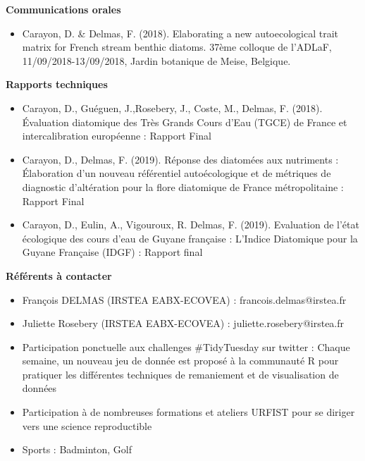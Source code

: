 \documentclass[localFont,alternative]{yaac-another-awesome-cv}
\begin{document}
\textbf{Communications orales}
\begin{itemize}
\item Carayon, D. \& Delmas, F. (2018). Elaborating a new autoecological trait matrix for French stream benthic diatoms. 37ème colloque de l’ADLaF, 11/09/2018-13/09/2018, Jardin botanique de Meise, Belgique.
\end{itemize}

\textbf{Rapports techniques}
\begin{itemize}
\item Carayon, D., Guéguen, J.,Rosebery, J., Coste, M., Delmas, F. (2018). Évaluation diatomique des Très Grands Cours d’Eau (TGCE) de France et intercalibration européenne : Rapport Final

\item Carayon, D., Delmas, F. (2019). Réponse des diatomées aux nutriments : Élaboration d'un nouveau référentiel autoécologique et de métriques de diagnostic d'altération pour la flore diatomique de France métropolitaine : Rapport Final

\item Carayon, D., Eulin, A., Vigouroux, R. Delmas, F. (2019). Evaluation de l’état écologique des cours d’eau de Guyane française : L’Indice Diatomique pour la Guyane Française (IDGF) : Rapport final
\end{itemize}


\textbf{Référents à contacter}
\begin{itemize}
\item François DELMAS (IRSTEA EABX-ECOVEA) : francois.delmas@irstea.fr
\item Juliette Rosebery (IRSTEA EABX-ECOVEA) : juliette.rosebery@irstea.fr
\end{itemize}

	


\begin{itemize}
\item Participation ponctuelle aux challenges \#TidyTuesday sur twitter : Chaque semaine, un nouveau jeu de donnée est proposé à la communauté R pour pratiquer les différentes techniques de remaniement et de visualisation de données
\item Participation à de nombreuses formations et ateliers URFIST pour se diriger vers une science reproductible
\item Sports : Badminton, Golf
\end{itemize}
\end{document}
